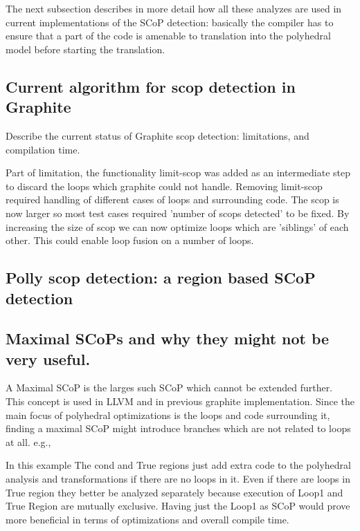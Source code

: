 \documentclass{sigplanconf}
\begin{document}
The next subsection describes in more detail how all these analyzes are used in
current implementations of the SCoP detection: basically the compiler has to
ensure that a part of the code is amenable to translation into the polyhedral
model before starting the translation.

\subsection{Current algorithm for scop detection in Graphite}

Describe the current status of Graphite scop detection: limitations, and compilation time.

Part of limitation, the functionality limit-scop was added as an intermediate
step to discard the loops which graphite could not handle. Removing limit-scop
required handling of different cases of loops and surrounding code.  The scop is
now larger so most test cases required 'number of scops detected' to be
fixed. By increasing the size of scop we can now optimize loops which are
'siblings' of each other. This could enable loop fusion on a number of loops.

\subsection{Polly scop detection: a region based SCoP detection}

\subsection{Maximal SCoPs and why they might not be very useful.}
A Maximal SCoP is the larges such SCoP which cannot be extended further. This concept is used
in LLVM 
and in previous graphite implementation.
Since the main focus of
polyhedral optimizations is the loops and code surrounding it, finding a maximal SCoP might introduce branches
which are not related to loops at all. e.g.,

\begin{comment}
Scop
Cond
|
|--True Region
|
|--False Region
|       | Loop1
|       |
\end{comment}

In this example The cond and True regions just add extra code to the polyhedral analysis and transformations if there
are no loops in it. Even if there are loops in True region they better be analyzed separately because
execution of Loop1 and True Region are mutually exclusive.
Having just the Loop1 as SCoP would prove more beneficial in terms of optimizations and overall compile time.
\end{document}
